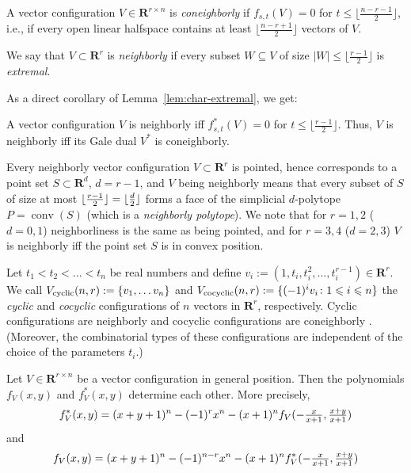 \documentclass[a4paper,USenglish,cleveref, autoref, thm-restate,nolineno]{socg-lipics-v2021}
\DeclareMathOperator{\conv}{conv}
\renewcommand{\leq}{\leqslant}
\newcommand{\R}{\mathbf{R}}
\DeclarePairedDelimiter\floor{\lfloor}{\rfloor}
\newcommand{\cyclic}{V_{\textup{cyclic}}}
\newcommand{\cocyclic}{V_{\textup{cocyclic}}}
\begin{document}
\begin{definition} A vector configuration $V\in \R^{r \times n}$ is \emph{coneighborly} if $f_{s,t}(V) = 0$ for $t \leq \lfloor \frac{n-r-1}{2} \rfloor$, i.e., if every open linear halfspace contains at least $\lfloor \frac{n-r+1}{2} \rfloor$ vectors of $V$. 

We say that  $V \subset \R^r$ is \emph{neighborly} if every subset $W \subseteq V$ of size $|W| \leq \lfloor \frac{r-1}{2} \rfloor$ is \emph{extremal}.
\end{definition}

As a direct corollary of Lemma~\ref{lem:char-extremal}, we get:
\begin{corollary} 
\label{cor:neighborly-alternative}
A vector configuration  $V$ is neighborly iff $f^*_{s,t}(V)=0$ for $t \leq \lfloor \frac{r-1}{2} \rfloor$. Thus, $V$ is neighborly iff its Gale dual $V^*$ is coneighborly.
\end{corollary}

Every neighborly vector configuration $V \subset \R^r$ is pointed, hence corresponds to a point set $S\subset \R^d$, $d=r-1$, and $V$ being neighborly means that every subset of $S$ of size at most $\floor{\frac{r-1}{2}}=\floor{\frac{d}{2}}$ forms a face of the simplicial $d$-polytope $P=\conv(S)$ (which is a \emph{neighborly polytope}). We note that for $r=1,2$ ($d=0,1$) neighborliness is the same as being pointed, and for $r=3,4$ ($d=2,3$) $V$ is neighborly iff the point set $S$ is in convex position.


\begin{example}
\label{ex:cyclic-cocyclic}
Let $t_1<t_2<\dots<t_n$ be real numbers and define $v_i:= (1,t_i,t_i^2,\dots,t_i^{r-1}) \in \R^r$. We call $\cyclic(n,r):=\{v_1,\dots v_n\}$ and $\cocyclic(n,r):=\{(-1)^i v_i\colon 1\leq i\leq n\}$ the \emph{cyclic} and \emph{cocyclic} configurations of $n$ vectors in $\R^r$, respectively. Cyclic configurations are neighborly and cocyclic configurations are  
coneighborly \cite[Cor. 0.8]{Ziegler:1995aa}. (Moreover, the combinatorial types of these configurations are independent of the choice of the parameters $t_i$.)
\end{example}

\begin{theorem} 
\label{thm:f-fstar}
Let $V \in \R^{r\times n}$ be a vector configuration in general position. Then the polynomials $f_V(x,y)$ and $f^*_V(x,y)$ determine each other. More precisely,
\begin{equation}
\label{eq:fstar-f}
\hfill
f^*_V(x,y)=(x+y+1)^n - (-1)^r x^n -(x+1)^n f_V(\textstyle -\frac{x}{x+1},\frac{x+y}{x+1})
\hfill
\end{equation}
and
\begin{equation}
\label{eq:f-fstar}
\hfill
f_V(x,y)=(x+y+1)^n - (-1)^{n-r} x^n -(x+1)^n f^*_V(\textstyle -\frac{x}{x+1},\frac{x+y}{x+1})
\hfill
\end{equation}
\end{theorem}
\end{document}
